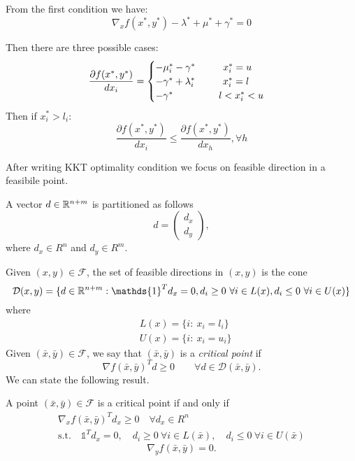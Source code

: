 From the first condition we have:
\begin{equation}
 \nabla_x f(x^*,y^*)-\lambda^*+\mu^*+\gamma^*=0
\end{equation}

Then there are three possible cases:
\begin{equation}
 \frac{\partial f(x^*,y^*)}{dx_i} = \begin{cases} -\mu_i^* -\gamma^* \hspace{1cm} x^*_i =u \\
 -\gamma^*+\lambda^*_i \hspace{1cm} x^*_i =l \\
 -\gamma^* \hspace{1.65cm} l<x^*_i <u 
\end{cases}
\end{equation}
Then if $x^*_i>l_i$: 
\begin{equation}
 \frac{\partial f(x^*,y^*)}{dx_i} \le \frac{\partial f(x^*,y^*)}{dx_h}, \forall h
\end{equation}

After writing KKT optimality condition we focus on feasible direction in a feasibile point.

A vector $d\in \mathbb{R}^{n+m}$ is partitioned as follows
$$
d=\left(
\begin{array}{c}
d_x\\
d_y
\end{array}
\right ),
$$
where $d_x\in R^n$ and $d_y\in R^m$.

Given $(x,y) \in \mathcal{F}$, the set of feasible directions in $(x,y)$ is the cone
\begin{equation}
 \mathcal{D}(x,y)=\{ d \in \R^{n+m}: \mathds{1}^Td_x=0, d_i\ge 0 \ \forall i \in L(x), d_i\le 0 \ \forall i \in U(x)\}
\end{equation}
where
\begin{equation}
 \begin{aligned}
  &L(x)=\{ i: \ x_i=l_i\}\\
  &U(x)=\{ i: \ x_i=u_i\}
 \end{aligned}
\end{equation}
Given $(\bar x,\bar y) \in \mathcal{F}$, we say that $(\bar x,\bar y)$ is a {\it critical point} if
$$
\nabla f(\bar x,\bar y)^Td\ge 0\quad\quad \forall d\in  \mathcal{D}(\bar x,\bar y).
$$
We can state the following result.
\begin{proposition}\label{optimality}
A point $(\bar x,\bar y) \in \mathcal{F}$ is a critical point if and only if
\begin{equation}\label{on_x}
\begin{aligned}
&\nabla_xf(\bar x,\bar y)^Td_x\ge 0 \quad \forall d_x\in R^n & \\ 
&\text{s.t.} \quad \mathds{1}^Td_x=0,\quad d_i\ge 0 \ \forall i \in L(\bar x), \quad d_i\le 0 \ \forall i \in U(\bar x)&
\end{aligned}
\end{equation}
\begin{equation}\label{on_y}
 \nabla_yf(\bar x,\bar y)=0.
\end{equation} 
\end{proposition}


